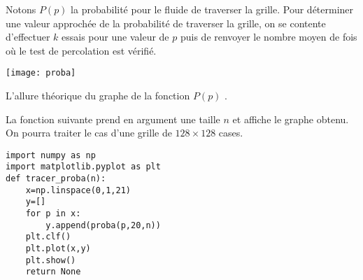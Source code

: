 
Notons $P(p)$ la probabilité pour le fluide de traverser la grille. Pour déterminer une valeur approchée de la probabilité de traverser la grille, on se contente d'effectuer $k$ essais pour une valeur de $p$ puis de renvoyer le nombre moyen de fois où le test de percolation est vérifié.\\

\begin{marginfigure}
\texttt{[image: proba]}
\caption{L'allure théorique du graphe de la fonction $P(p)$ \label{fig3}.}
\end{marginfigure}






La fonction suivante prend en argument une taille $n$ et affiche le graphe obtenu. On pourra traiter le 
cas d'une grille de $128\times 128$ cases.%

\begin{lstlisting}
import numpy as np
import matplotlib.pyplot as plt
def tracer_proba(n):
    x=np.linspace(0,1,21)
    y=[]
    for p in x:
        y.append(proba(p,20,n))
    plt.clf()
    plt.plot(x,y)
    plt.show()
    return None
\end{lstlisting}

